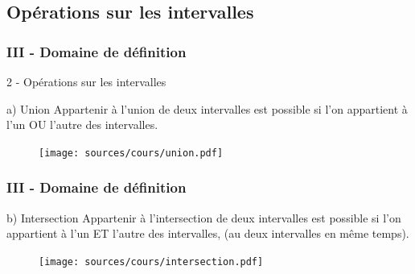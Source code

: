 \documentclass{beamer}
\begin{document}
\subsection{Opérations sur les intervalles}

\begin{frame}
  \frametitle{III - Domaine de définition}

  \begin{block}{2 - Opérations sur les intervalles}
  \end{block}

  \begin{exampleblock}{a) Union}
    Appartenir à l'union de deux intervalles est possible si l'on appartient à l'un OU l'autre des intervalles.
  \end{exampleblock}

  \begin{figure}[H]
    \centering
    \texttt{[image: sources/cours/union.pdf]}
    \caption{}
  \end{figure}

\end{frame}



\begin{frame}
  \frametitle{III - Domaine de définition}

  \begin{exampleblock}{b) Intersection}
Appartenir à l'intersection de deux intervalles est possible si l'on appartient à l'un ET l'autre des intervalles, (au deux intervalles en même temps).
  \end{exampleblock}

  \begin{figure}[H]
    \centering
    \texttt{[image: sources/cours/intersection.pdf]}
    \caption{}
  \end{figure}

\end{frame}
\end{document}
